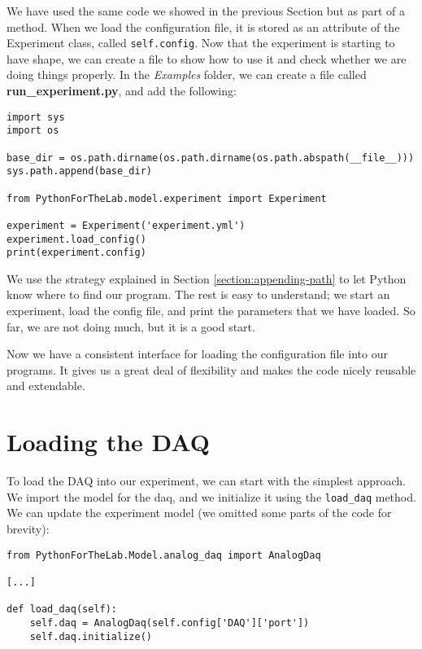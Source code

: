 We have used the same code we showed in the previous Section but as part of a method. When we load the configuration file, it is stored as an attribute of the Experiment class, called \texttt{self.config}. Now that the experiment is starting to have shape, we can create a file to show how to use it and check whether we are doing things properly. In the \emph{Examples} folder, we can create a file called \textbf{run\_experiment.py}, and add the following:

\begin{verbatim}
import sys
import os

base_dir = os.path.dirname(os.path.dirname(os.path.abspath(__file__)))
sys.path.append(base_dir)

from PythonForTheLab.model.experiment import Experiment

experiment = Experiment('experiment.yml')
experiment.load_config()
print(experiment.config)
\end{verbatim}

We use the strategy explained in Section \ref{section:appending-path} to let Python know where to find our program. The rest is easy to understand; we start an experiment, load the config file, and print the parameters that we have loaded. So far, we are not doing much, but it is a good start.

Now we have a consistent interface for loading the configuration file into our programs. It gives us a great deal of flexibility and makes the code nicely reusable and extendable.


\section{Loading the DAQ}\label{section:loading-daq}
To load the DAQ into our experiment, we can start with the simplest approach. We import the model for the daq, and we initialize it using the \texttt{load\_daq} method. We can update the experiment model (we omitted some parts of the code for brevity):

\begin{verbatim}
from PythonForTheLab.Model.analog_daq import AnalogDaq

[...]

def load_daq(self):
    self.daq = AnalogDaq(self.config['DAQ']['port'])
    self.daq.initialize()
\end{verbatim}

